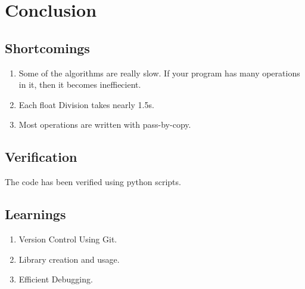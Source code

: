 \section{Conclusion}

\subsection{Shortcomings}
\begin{enumerate}
	\item Some of the algorithms are really slow. If your program has many operations in it, then it becomes ineffiecient.
	\item Each float Division takes nearly 1.5s.
	\item Most operations are written with pass-by-copy.
\end{enumerate}

\subsection{Verification}
The code has been verified using python scripts.

\subsection{Learnings}
\begin{enumerate}
	\item Version Control Using Git.
	\item Library creation and usage.
	\item Efficient Debugging.
\end{enumerate}